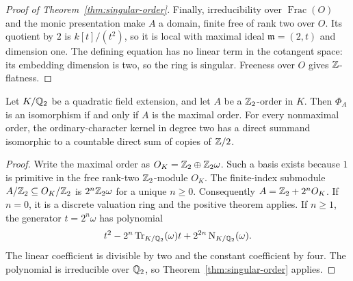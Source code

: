 \begin{proof}[Proof of Theorem~\ref{thm:singular-order}]
Finally, irreducibility over $\operatorname{Frac}(O)$ and the monic
presentation make $A$ a domain, finite free of rank two over $O$.
Its quotient by $2$ is $k[t]/(t^2)$, so it is local with maximal ideal
$\mathfrak m=(2,t)$ and dimension one.  The defining equation has no
linear term in the cotangent space: its embedding dimension is two,
so the ring is singular.  Freeness over $O$ gives $\mathbb Z$-flatness.
\end{proof}

\begin{corollary}\label{cor:quadratic-order-classification}
Let $K/\mathbb Q_2$ be a quadratic field extension, and let $A$ be a
$\mathbb Z_2$-order in $K$.  Then $\Phi_A$ is an isomorphism if and only if
$A$ is the maximal order.  For every nonmaximal order, the
ordinary-character kernel in degree two has a direct summand
isomorphic to a countable direct sum of copies of $\mathbb Z/2$.
\end{corollary}

\begin{proof}
Write the maximal order as $O_K=\mathbb Z_2\oplus\mathbb Z_2\omega$.
Such a basis exists because $1$ is primitive in the free rank-two
$\mathbb Z_2$-module $O_K$.  The finite-index submodule
$A/\mathbb Z_2\subseteq O_K/\mathbb Z_2$ is $2^n\mathbb Z_2\omega$ for a unique $n\ge0$.
Consequently $A=\mathbb Z_2+2^nO_K$.  If $n=0$, it is a discrete valuation
ring and the positive theorem applies.  If $n\ge1$, the generator
$t=2^n\omega$ has polynomial
\[
 t^2-2^n\operatorname{Tr}_{K/\mathbb Q_2}(\omega)t
       +2^{2n}\operatorname{N}_{K/\mathbb Q_2}(\omega).
\]
The linear coefficient is divisible by two and the constant
coefficient by four.  The polynomial is irreducible over $\mathbb Q_2$,
so Theorem~\ref{thm:singular-order} applies.
\end{proof}
